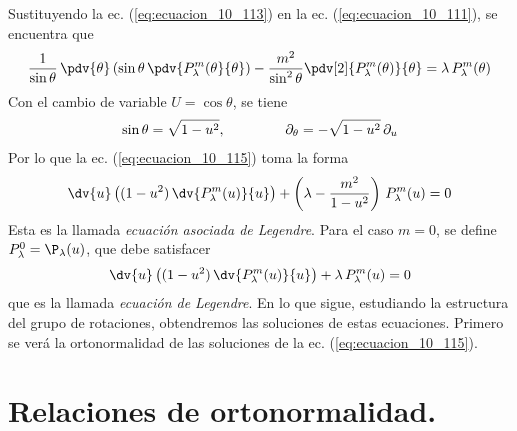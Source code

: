 Sustituyendo la ec. (\ref{eq:ecuacion_10_113}) en la ec. (\ref{eq:ecuacion_10_111}), se encuentra que
\begin{align}
\dfrac{1}{\sin \theta} \, \pdv{\theta} \left( \sin \theta \, \pdv{P_{\lambda}^{m} (\theta}{\theta} \right) - \dfrac{m^{2}}{\sin^{2} \theta} \pdv[2]{P_{\lambda}^{m} (\theta)}{\theta} = \lambda \, P_{\lambda}^{m} (\theta) \label{eq:ecuacion_10_115}
\end{align}
Con el cambio de variable $U = \cos \theta$, se tiene
\begin{align}
\sin \theta = \sqrt{1 - u^{2}}, \hspace{1.5cm} \partial_{\theta} = - \sqrt{1 - u^{2}} \, \partial_{u}
\label{eq:ecuacion_10_116}
\end{align}
Por lo que la ec. (\ref{eq:ecuacion_10_115}) toma la forma
\begin{align}
\dv{u} \left( (1 - u^{2}) \, \dv{P_{\lambda}^{m} (u)}{u} \right) + \left( \lambda - \dfrac{m^{2}}{1 - u^{2}} \right) \, P_{\lambda}^{m} (u) = 0
\label{eq:ecuacion_10_117}
\end{align}
Esta es la llamada \emph{ecuación asociada de Legendre}.
 Para el caso $m = 0$, se define $P_{\lambda}^{0} = \P_{\lambda} (u)$, que debe satisfacer
 \begin{align}
\dv{u} \left( (1 - u^{2}) \, \dv{P_{\lambda}^{m} (u)}{u} \right) + \lambda \, P_{\lambda}^{m} (u) = 0
\label{eq:ecuacion_10_118}
\end{align}
que es la llamada \emph{ecuación de Legendre}. En lo que sigue, estudiando la estructura del grupo de rotaciones, obtendremos las soluciones de estas ecuaciones. Primero se verá la ortonormalidad de las soluciones de la ec. (\ref{eq:ecuacion_10_115}).
\section{Relaciones de ortonormalidad.}
